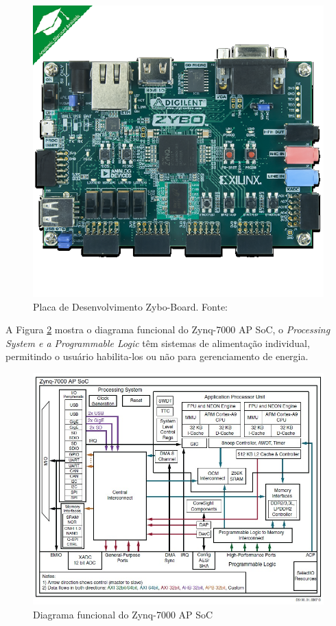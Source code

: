 \begin{figure}[h]
	\centering
	\includegraphics[keepaspectratio=true,scale=1.0]{figuras/zyboboard.eps}
	\caption{Placa de Desenvolvimento Zybo-Board. Fonte: \cite{DigilentZybo}}
	\label{Zybo Board}
\end{figure}

A Figura \ref{diaagrama-zynq} mostra o diagrama funcional do Zynq-7000 AP SoC, o \textit{Processing System e a Programmable Logic} têm sistemas de alimentação individual, permitindo o usuário habilita-los ou não para gerenciamento de energia. 
\begin{figure}[h]
	\centering
	\includegraphics[keepaspectratio=true,scale=0.6]{figuras/diagrama-zinq.jpeg}
	\caption{Diagrama funcional do Zynq-7000 AP SoC }
	\label{diaagrama-zynq}
\end{figure}

